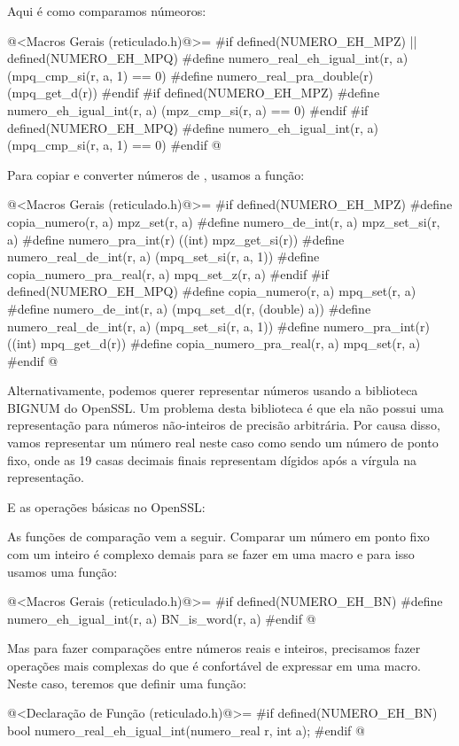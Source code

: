 Aqui é como comparamos númeoros:

\iniciocodigo
@<Macros Gerais (reticulado.h)@>=
#if defined(NUMERO_EH_MPZ) || defined(NUMERO_EH_MPQ)
#define numero_real_eh_igual_int(r, a) (mpq_cmp_si(r, a, 1) == 0)
#define numero_real_pra_double(r) (mpq_get_d(r))
#endif
#if defined(NUMERO_EH_MPZ)
#define numero_eh_igual_int(r, a) (mpz_cmp_si(r, a) == 0)
#endif
#if defined(NUMERO_EH_MPQ)
#define numero_eh_igual_int(r, a) (mpq_cmp_si(r, a, 1) == 0)
#endif
@
\fimcodigo


Para copiar e converter números de , usamos a função:

\iniciocodigo
@<Macros Gerais (reticulado.h)@>=
#if defined(NUMERO_EH_MPZ)
#define copia_numero(r, a) mpz_set(r, a)
#define numero_de_int(r, a) mpz_set_si(r, a)
#define numero_pra_int(r) ((int) mpz_get_si(r))
#define numero_real_de_int(r, a) (mpq_set_si(r, a, 1))
#define copia_numero_pra_real(r, a) mpq_set_z(r, a)
#endif
#if defined(NUMERO_EH_MPQ)
#define copia_numero(r, a) mpq_set(r, a)
#define numero_de_int(r, a) (mpq_set_d(r, (double) a))
#define numero_real_de_int(r, a) (mpq_set_si(r, a, 1))
#define numero_pra_int(r) ((int) mpq_get_d(r))
#define copia_numero_pra_real(r, a) mpq_set(r, a)
#endif
@
\fimcodigo


Alternativamente, podemos querer representar números usando a
biblioteca BIGNUM do OpenSSL. Um problema desta biblioteca é que ela
não possui uma representação para números não-inteiros de precisão
arbitrária. Por causa disso, vamos representar um número real neste
caso como sendo um número de ponto fixo, onde as 19 casas decimais
finais representam dígidos após a vírgula na representação.



E as operações básicas no OpenSSL:


As funções de comparação vem a seguir. Comparar um número em ponto
fixo com um inteiro é complexo demais para se fazer em uma macro e
para isso usamos uma função:

\iniciocodigo
@<Macros Gerais (reticulado.h)@>=
#if defined(NUMERO_EH_BN)
#define numero_eh_igual_int(r, a) BN_is_word(r, a)
#endif
@
\fimcodigo

Mas para fazer comparações entre números reais e inteiros, precisamos
fazer operações mais complexas do que é confortável de expressar em
uma macro. Neste caso, teremos que definir uma função:

\iniciocodigo
@<Declaração de Função (reticulado.h)@>=
#if defined(NUMERO_EH_BN)
bool numero_real_eh_igual_int(numero_real r, int a);
#endif
@
\fimcodigo

